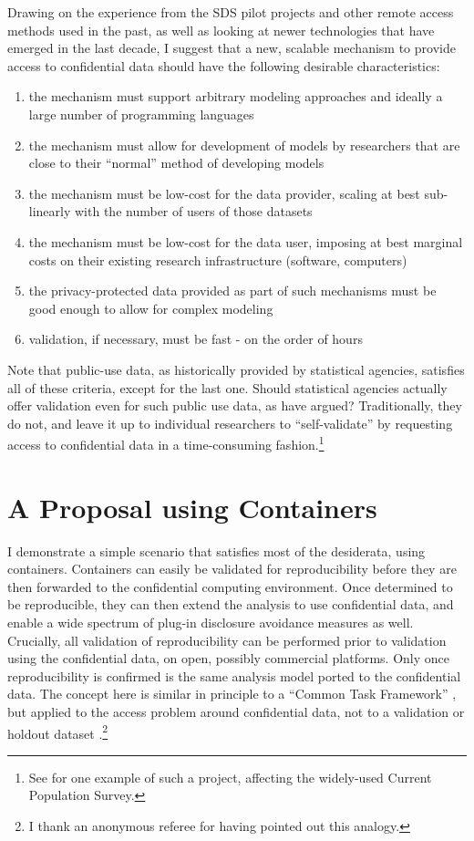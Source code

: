 \documentclass[]{hdsr}
\begin{document}
Drawing on the experience from the SDS pilot projects and other remote access methods used in the past, as well as looking at newer technologies that have emerged in the last decade, I suggest that a new, scalable mechanism to provide access to confidential data should have the following desirable characteristics:

\begin{enumerate}
    \item the mechanism must support arbitrary modeling approaches and ideally a large number of programming languages
    \item the mechanism must allow for development of models by researchers that are close to their ``normal'' method of developing models
    \item the mechanism must be low-cost for the data provider, scaling at best sub-linearly with the number of users of those datasets
    \item the mechanism must be low-cost for the data user, imposing at best marginal costs on their existing research infrastructure (software, computers)
    \item the privacy-protected data provided as part of such mechanisms must be good enough to allow for complex modeling
    \item validation, if necessary, must be fast - on the order of hours
\end{enumerate}

Note that public-use data, as historically provided by statistical agencies, satisfies all of these criteria, except for the last one. Should statistical agencies actually offer validation even for such public use data, as \citet{reiter_verification_2009} have argued? Traditionally, they do not, and leave it up to individual researchers to ``self-validate'' by requesting access to confidential data in a time-consuming fashion.\footnote{See \cite{armour_using_2016} for one example of such a project, affecting the widely-used Current Population Survey.}

\section{A Proposal using Containers}
\label{sec:proposal}
I demonstrate a simple scenario that satisfies most of the desiderata,  using containers.  Containers can easily be validated for reproducibility before they are then forwarded to the confidential computing environment. Once determined to be reproducible, they can then extend the analysis to use confidential data, and enable a wide spectrum of plug-in disclosure avoidance measures as well. Crucially, all validation of reproducibility can be performed prior to validation using the confidential data, on open, possibly commercial platforms. Only once reproducibility is confirmed is the same analysis model ported to the confidential data. The concept here is similar in principle to a ``Common Task Framework'' \citep{liberman_obituary_2010,liberman_reproducible_2014,liu_successes_2019}, but applied to the access problem around confidential data, not to a validation or holdout dataset \citep{liu_successes_2019,donoho_data_2024}.\footnote{I thank an anonymous referee for having pointed out this analogy.}  
\end{document}
